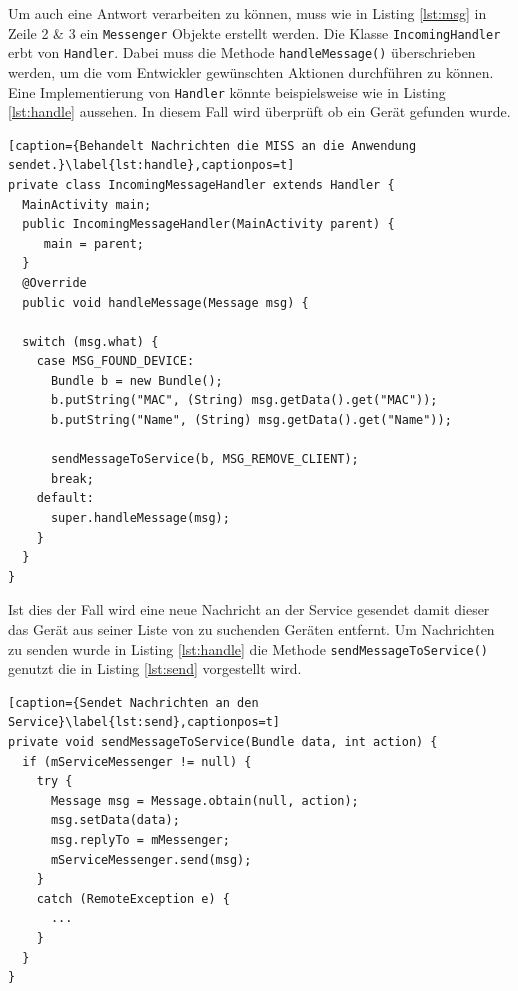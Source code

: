\documentclass[]{report}
\begin{document}
 Um auch eine Antwort verarbeiten zu können, muss wie in Listing \ref{lst:msg} in Zeile 2 \& 3 ein \texttt{Messenger} Objekte erstellt werden. Die Klasse \texttt{IncomingHandler} erbt von \texttt{Handler}. Dabei muss die Methode \texttt{handleMessage()} überschrieben werden, um die vom Entwickler gewünschten Aktionen durchführen zu können. Eine Implementierung von \texttt{Handler} könnte beispielsweise wie in Listing \ref{lst:handle} aussehen. In diesem Fall wird überprüft ob ein Gerät gefunden wurde. 
\begin{lstlisting}[caption={Behandelt Nachrichten die MISS an die Anwendung sendet.}\label{lst:handle},captionpos=t] 
private class IncomingMessageHandler extends Handler {
  MainActivity main;
  public IncomingMessageHandler(MainActivity parent) {
     main = parent;
  }
  @Override
  public void handleMessage(Message msg) {
  
  switch (msg.what) {
    case MSG_FOUND_DEVICE:
	  Bundle b = new Bundle();
	  b.putString("MAC", (String) msg.getData().get("MAC"));
	  b.putString("Name", (String) msg.getData().get("Name"));
	  
	  sendMessageToService(b, MSG_REMOVE_CLIENT);
      break;
    default:
      super.handleMessage(msg);
    }
  }
}
\end{lstlisting}
Ist dies der Fall wird eine neue Nachricht an der Service gesendet damit dieser das Gerät aus seiner Liste von zu suchenden Geräten entfernt. Um Nachrichten zu senden wurde in Listing \ref{lst:handle} die Methode \texttt{sendMessageToService()} genutzt die in Listing \ref{lst:send} vorgestellt wird. 
\begin{lstlisting}[caption={Sendet Nachrichten an den Service}\label{lst:send},captionpos=t] 
private void sendMessageToService(Bundle data, int action) {
  if (mServiceMessenger != null) {
    try {
      Message msg = Message.obtain(null, action);
      msg.setData(data);
      msg.replyTo = mMessenger;
      mServiceMessenger.send(msg);
    } 
    catch (RemoteException e) {
      ...
    }
  }
}
\end{lstlisting}
\end{document}
